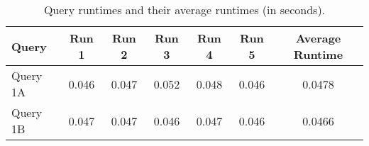 \documentclass{article}
\begin{document}
\begin{table}[h!]
\centering
\begin{tabular}{lccccc|c}
\toprule
\textbf{Query} & \textbf{Run 1} & \textbf{Run 2} & \textbf{Run 3} & \textbf{Run 4} & \textbf{Run 5} & \textbf{Average Runtime} \\
\midrule
Query 1A & 0.046 & 0.047 & 0.052 & 0.048 & 0.046 & 0.0478 \\
Query 1B & 0.047 & 0.047 & 0.046 & 0.047 & 0.046 & 0.0466 \\
\bottomrule
\end{tabular}
\caption{Query runtimes and their average runtimes (in seconds).}
\label{tab:query_runtimes}
\end{table}
\end{document}
